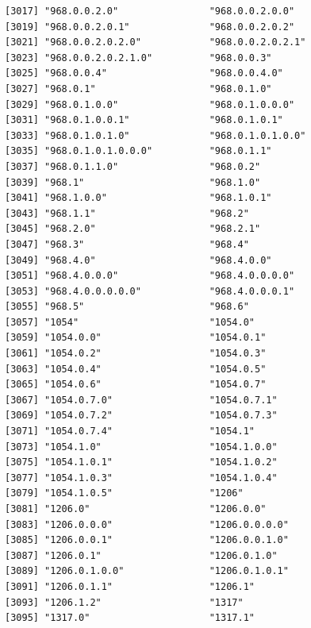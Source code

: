 \documentclass[
  letterpaper,
  DIV=11,
  numbers=noendperiod]{scrreprt}
\begin{document}
\begin{verbatim}
[3017] "968.0.0.2.0"                "968.0.0.2.0.0"             
[3019] "968.0.0.2.0.1"              "968.0.0.2.0.2"             
[3021] "968.0.0.2.0.2.0"            "968.0.0.2.0.2.1"           
[3023] "968.0.0.2.0.2.1.0"          "968.0.0.3"                 
[3025] "968.0.0.4"                  "968.0.0.4.0"               
[3027] "968.0.1"                    "968.0.1.0"                 
[3029] "968.0.1.0.0"                "968.0.1.0.0.0"             
[3031] "968.0.1.0.0.1"              "968.0.1.0.1"               
[3033] "968.0.1.0.1.0"              "968.0.1.0.1.0.0"           
[3035] "968.0.1.0.1.0.0.0"          "968.0.1.1"                 
[3037] "968.0.1.1.0"                "968.0.2"                   
[3039] "968.1"                      "968.1.0"                   
[3041] "968.1.0.0"                  "968.1.0.1"                 
[3043] "968.1.1"                    "968.2"                     
[3045] "968.2.0"                    "968.2.1"                   
[3047] "968.3"                      "968.4"                     
[3049] "968.4.0"                    "968.4.0.0"                 
[3051] "968.4.0.0.0"                "968.4.0.0.0.0"             
[3053] "968.4.0.0.0.0.0"            "968.4.0.0.0.1"             
[3055] "968.5"                      "968.6"                     
[3057] "1054"                       "1054.0"                    
[3059] "1054.0.0"                   "1054.0.1"                  
[3061] "1054.0.2"                   "1054.0.3"                  
[3063] "1054.0.4"                   "1054.0.5"                  
[3065] "1054.0.6"                   "1054.0.7"                  
[3067] "1054.0.7.0"                 "1054.0.7.1"                
[3069] "1054.0.7.2"                 "1054.0.7.3"                
[3071] "1054.0.7.4"                 "1054.1"                    
[3073] "1054.1.0"                   "1054.1.0.0"                
[3075] "1054.1.0.1"                 "1054.1.0.2"                
[3077] "1054.1.0.3"                 "1054.1.0.4"                
[3079] "1054.1.0.5"                 "1206"                      
[3081] "1206.0"                     "1206.0.0"                  
[3083] "1206.0.0.0"                 "1206.0.0.0.0"              
[3085] "1206.0.0.1"                 "1206.0.0.1.0"              
[3087] "1206.0.1"                   "1206.0.1.0"                
[3089] "1206.0.1.0.0"               "1206.0.1.0.1"              
[3091] "1206.0.1.1"                 "1206.1"                    
[3093] "1206.1.2"                   "1317"                      
[3095] "1317.0"                     "1317.1"                    

\end{verbatim}
\end{document}
